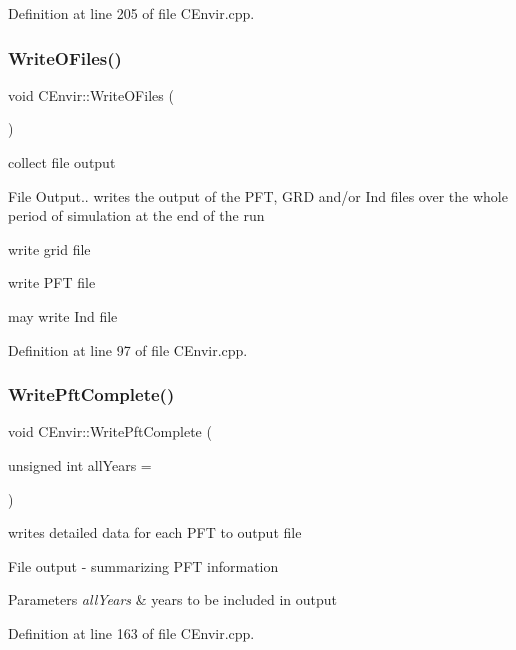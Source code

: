 Definition at line 205 of file C\+Envir.\+cpp.

\mbox{\label{class_c_envir_a6360f8dae599cd805953dc8b62983d73}} 
\subsubsection{\texorpdfstring{WriteOFiles()}{WriteOFiles()}}
{\footnotesize\ttfamily void C\+Envir\+::\+Write\+O\+Files (\begin{DoxyParamCaption}{ }\end{DoxyParamCaption})}



collect file output 

File Output.. writes the output of the P\+FT, G\+RD and/or Ind files over the whole period of simulation at the end of the run

write grid file

write P\+FT file

may write Ind file 

Definition at line 97 of file C\+Envir.\+cpp.

\mbox{\label{class_c_envir_ab95d6a59533857595e6a02fa25e825f3}} 
\subsubsection{\texorpdfstring{WritePftComplete()}{WritePftComplete()}}
{\footnotesize\ttfamily void C\+Envir\+::\+Write\+Pft\+Complete (\begin{DoxyParamCaption}\item[{unsigned int}]{all\+Years = {} }\end{DoxyParamCaption})}



writes detailed data for each P\+FT to output file 

File output -\/ summarizing P\+FT information 
\begin{DoxyParams}{Parameters}
{\em all\+Years} & years to be included in output \\
\hline
\end{DoxyParams}


Definition at line 163 of file C\+Envir.\+cpp.



